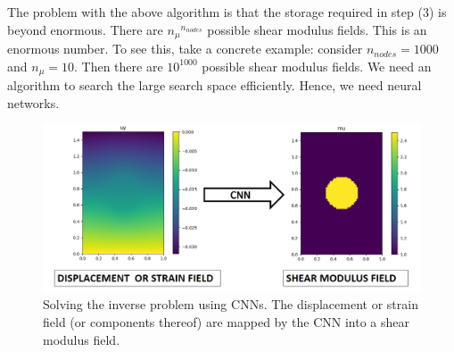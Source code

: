 \documentclass[12pt]{article}
\begin{document}
The problem with the above algorithm is that the storage required in step (3) is beyond enormous. There are ${n_{\mu}}^{n_{nodes}}$ possible shear modulus fields. This is an enormous number. To see this, take a concrete example: consider $n_{nodes}=1000$ and $n_{\mu}=10$. Then there are $10^{1000}$ possible shear modulus fields. We need an algorithm to search the large search space efficiently. Hence, we need neural networks.
%
\begin{figure}[h]
   \centering
    \includegraphics[totalheight=5cm]{Figures/schematic_inv/schematic_inv.png}
  \caption{\label{fig:schematic_inv} Solving the inverse problem using CNNs. The displacement or strain field (or components thereof) are mapped by the CNN into a shear modulus field.}
\end{figure}
%
\end{document}
